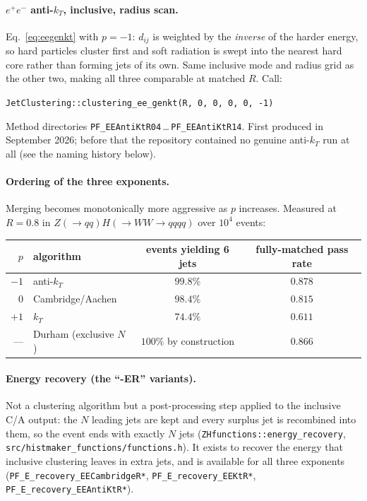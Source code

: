 \documentclass[11pt,a4paper]{article}
\newcommand{\ee}{$e^{+}e^{-}$}
\newcommand{\dij}{d_{ij}}
\begin{document}
\paragraph{\ee{} anti-$k_T$, inclusive, radius scan.}
Eq.~\eqref{eq:eegenkt} with $p=-1$: $\dij$ is weighted by the \emph{inverse} of the
harder energy, so hard particles cluster first and soft radiation is swept into the
nearest hard core rather than forming jets of its own. Same inclusive mode and radius
grid as the other two, making all three comparable at matched $R$. Call:
\begin{center}
\texttt{JetClustering::clustering\_ee\_genkt(R, 0, 0, 0, 0, -1)}
\end{center}
Method directories \texttt{PF\_EEAntiKtR04}\,\dots\,\texttt{PF\_EEAntiKtR14}.
First produced in September 2026; before that the repository contained no genuine
anti-$k_T$ run at all (see the naming history below).

\paragraph{Ordering of the three exponents.}
Merging becomes monotonically more aggressive as $p$ increases. Measured at $R=0.8$ in
$Z(\to qq)H(\to WW \to qqqq)$ over $10^4$ events:

\begin{center}
\small
\begin{tabular}{@{}rlcc@{}}
\toprule
$p$ & algorithm & events yielding 6 jets & fully-matched pass rate \\
\midrule
$-1$ & anti-$k_T$ & $99.8\%$ & $0.878$ \\
$0$ & Cambridge/Aachen & $98.4\%$ & $0.815$ \\
$+1$ & $k_T$ & $74.4\%$ & $0.611$ \\
\midrule
--- & Durham (exclusive $N$) & $100\%$ by construction & $0.866$ \\
\bottomrule
\end{tabular}
\end{center}

\paragraph{Energy recovery (the ``-ER'' variants).}
Not a clustering algorithm but a post-processing step applied to the inclusive
C/A output: the $N$ leading jets are kept and every surplus jet is recombined
into them, so the event ends with exactly $N$ jets
(\texttt{ZHfunctions::energy\_recovery}, \texttt{src/histmaker\_functions/functions.h}).
It exists to recover the energy that inclusive clustering leaves in extra jets,
and is available for all three exponents
(\texttt{PF\_E\_recovery\_EECambridgeR*}, \texttt{PF\_E\_recovery\_EEKtR*},
\texttt{PF\_E\_recovery\_EEAntiKtR*}).
\end{document}
